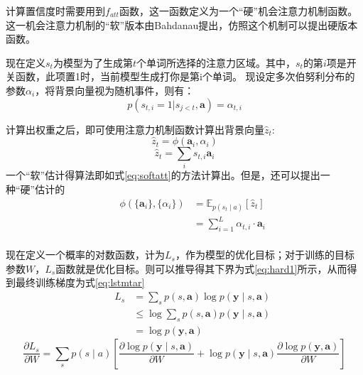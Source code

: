 计算置信度时需要用到$f_{att}$函数，这一函数定义为一个“硬”机会注意力机制函数。
这一机会注意力机制的“软”版本由Bahdanau提出，仿照这个机制可以提出硬版本函数。

现在定义$s_t$为模型为了生成第$t$个单词所选择的注意力区域。其中，$s_t$的第$i$项是开关函数，此项置1时，当前模型生成打你是第i个单词。
现设定多次伯努利分布的参数${\alpha_i}$，将背景向量视为随机事件，则有：
\begin{equation}
    p(s_{t,i} = 1|s_{j<t}, \textbf{a}) = \alpha_{t,i}
\end{equation}

计算出权重之后，即可使用注意力机制函数计算出背景向量$\hat{z}_t$:
\begin{equation}
    \label{eq:bgvector}
    \hat{z}_t=\phi(\textbf{a}_i,\alpha_i)
\end{equation}
\begin{equation}
    \hat{z}_t = \sum_i s_{t,i}\textbf{a}_i
\end{equation}
一个“软”估计得算法即如式\eqref{eq:softatt}的方法计算出。但是，还可以提出一种“硬”估计的
\begin{equation}
    \begin{aligned}
        &&\phi(\{\textbf{a}_i\},\{\alpha_i\})&= \mathbb{E}_{p(s_t\mid a)} [\hat{z}_t] \\
        && & =\sum_{i=1}^L \alpha_{t,i} \cdot \textbf{a}_i \\
    \end{aligned}
    \label{eq:softatt}
\end{equation}

现在定义一个概率的对数函数，计为$L_s$，作为模型的优化目标；对于训练的目标参数$W$，$L_s$函数就是优化目标。则可以推导得其下界为式\eqref{eq:hard1}所示，从而得到最终训练梯度为式\eqref{eq:lstmtar}
\begin{equation}
    \begin{aligned}
        && L_s &= \sum_s p(s, \textbf{a}) \log p(\textbf{y}\mid {s }, \textbf{a} ) \\
        && & \le \log \sum_sp(s, \textbf{a}) p(\textbf{y}\mid {s }, \textbf{a} ) \\
        && & = \log p(\textbf{y}, \textbf{a})
    \end{aligned}
    \label{eq:hard1}
\end{equation}
\begin{equation}
    \frac{\partial L_s}{\partial W} = \sum_s p(s \mid a) [\frac{\partial \log p(\textbf{y}\mid {s }, \textbf{a} )}{\partial W} + \log p(\textbf{y}\mid {s }, \textbf{a} ) \frac{\partial \log p(\textbf{y}, \textbf{a})}{\partial W} ]
    \label{eq:lstmtar}
\end{equation}

